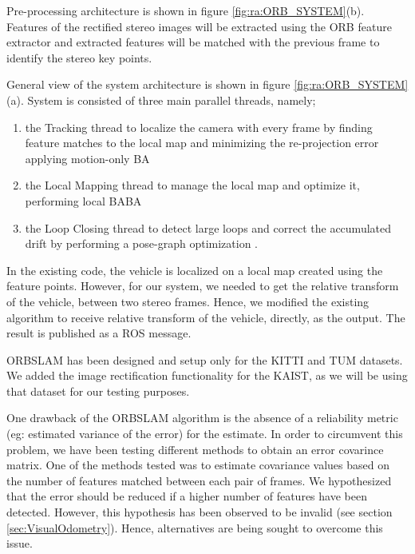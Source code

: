 Pre-processing architecture is shown in figure \ref{fig:ra:ORB_SYSTEM}(b). Features of the rectified stereo images will be extracted using the ORB feature extractor \cite{ra:ORB} and extracted features will be matched with the previous frame to identify the stereo key points. 

General view of the system architecture is shown in figure \ref{fig:ra:ORB_SYSTEM}(a). System is consisted of three main parallel threads, namely;
\begin{enumerate}
	\item the Tracking thread to localize the camera with every frame by finding feature matches to the local map and minimizing the re-projection error applying motion-only \gls{BA}
	\item the Local Mapping thread to manage the local map and optimize it, performing local BA\gls{BA}
	\item the Loop Closing thread to detect large loops and correct the accumulated drift by performing a pose-graph optimization \cite{ra:ORB_SLAM2}.
\end{enumerate} 

In the existing code, the vehicle is localized on a local map created using the feature points. However, for our system, we needed to get the relative transform of the vehicle, between two stereo frames. Hence, we modified the existing algorithm to receive relative transform of the vehicle, directly, as the output. The result is published as a \gls{ROS} message.

\gls{ORBSLAM} has been designed and setup only for the \gls{KITTI} and \gls{TUM} datasets. We added the image rectification functionality for the \gls{KAIST}, as we will be using that dataset for our testing purposes.

One drawback of the \gls{ORBSLAM} algorithm is the absence of a reliability metric (eg: estimated variance of the error) for the estimate. In order to circumvent this problem, we have been testing different methods to obtain an error covarince matrix. One of the methods tested was to estimate covariance values based on the number of features matched between each pair of frames. We hypothesized that the error should be reduced if a higher number of features have been detected. However, this hypothesis has been observed to be invalid (see section \ref{sec:VisualOdometry}). Hence, alternatives are being sought to overcome this issue. 









